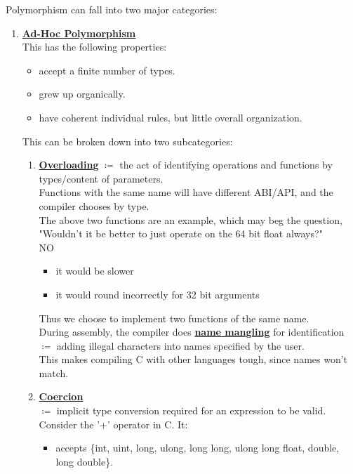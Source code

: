 \documentclass[../../lecture_notes.tex]{subfiles}
\begin{document}
Polymorphism can fall into two major categories:
\begin{enumerate} [itemsep=0mm]
	\item \textbf{\underline{Ad-Hoc Polymorphism}}\\
		This has the following properties:
			\begin{itemize} [itemsep=0mm]
				\item accept a finite number of types.
				\item grew up organically.
				\item have coherent individual rules, but little overall organization.
			\end{itemize}
		This can be broken down into two subcategories:
		\begin{enumerate} [itemsep=0mm]
			\item \textbf{\underline{Overloading}}
				$\coloneqq$ the act of identifying operations and functions by types/content of parameters.\\
				Functions with the same name will have different ABI/API, and the compiler chooses by type.\\
				The above two functions are an example, which may beg the question,\\
					"Wouldn't it be better to just operate on the 64 bit float always?"\\
				\indent NO 
					\begin{itemize} [itemsep=0mm]
						\item it would be slower
						\item it would round incorrectly for 32 bit arguments
					\end{itemize}
				Thus we choose to implement two functions of the same name.\\
				During assembly, the compiler does \textbf{\underline{name mangling}} for identification\\
					\indent $\coloneqq$ adding illegal characters into names specified by the user.\\
					\indent This makes compiling C with other languages tough, since names won't match.
			\item \textbf{\underline{Coercion}}\\
				$\coloneqq$ implicit type conversion required for an expression to be valid.\\
				Consider the '+' operator in C.  It:
				\begin{itemize} [itemsep=0mm]
					\item accepts \{int, uint, long, ulong, long long, ulong long float, double, long double\}.

\end{itemize}
\end{enumerate}
\end{enumerate}
\end{document}
